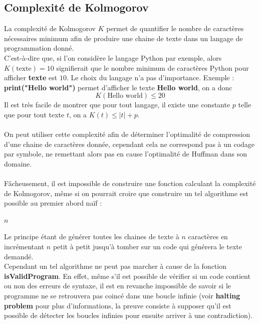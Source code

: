 \documentclass[a4paper, 12pt]{article}
\begin{document}
\subsection{Complexité de Kolmogorov}
La complexité de Kolmogorov $K$ permet de quantifier le nombre de caractères nécessaires minimum afin de produire une chaine de texte dans un langage de programmation donné. \\
C'est-à-dire que, si l'on considère le langage Python par exemple, alors $K(\text{texte}) = 10$ signifierait que le nombre minimum de caractères Python pour afficher \textbf{texte} est $10$.
Le choix du langage n'a pas d'importance.
Exemple : \\
\textbf{print("Hello world")} permet d'afficher le texte \textbf{Hello world}, on a donc
$$
K(\text{Hello world}) \leq 20
$$
Il est très facile de montrer que pour tout langage, il existe une constante $p$ telle que pour tout texte $t$, on a $K(t) \leq |t|+p$. \\ \\
On peut utiliser cette complexité afin de déterminer l'optimalité de compression d'une chaine de caractères donnée, cependant cela ne correspond pas à un codage par symbole, ne remettant alors pas en cause l'optimalité de Huffman dans son domaine. \\ \\
Fâcheusement, il est impossible de construire une fonction calculant la complexité de Kolmogorov, même si on pourrait croire que construire un tel algorithme est possible au premier abord naïf : \\

\begin{algorithm}
\begin{algorithmic}[1]
\State \Return $n$
\EndIf
\EndFor
\EndFor
\EndFunction
\end{algorithmic}
\end{algorithm}

Le principe étant de générer toutes les chaines de texte à $n$ caractères en incrémentant $n$ petit à petit jusqu'à tomber sur un code qui générera le texte demandé. \\
Cependant un tel algorithme ne peut pas marcher à cause de la fonction \textbf{isValidProgram}. En effet, même s'il est possible de vérifier si un code contient ou non des erreurs de syntaxe, il est en revanche impossible de savoir si le programme ne se retrouvera pas coincé dans une boucle infinie (voir \textbf{halting problem} pour plus d'informations, la preuve consiste à supposer qu'il est possible de détecter les boucles infinies pour ensuite arriver à une contradiction). \\
\end{document}
